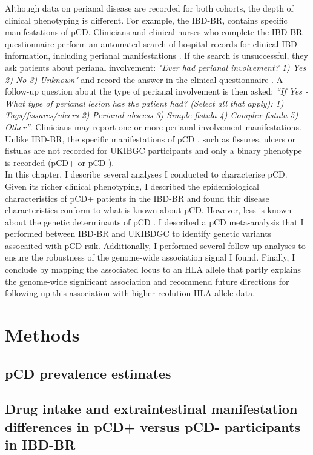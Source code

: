 Although data on perianal disease are recorded for both cohorts, the depth of clinical phenotyping is different. For example, the IBD-BR, contains specific manifestations of pCD. Clinicians and clinical nurses who complete the IBD-BR questionnaire perform an automated search of hospital records for clinical IBD information, including perianal manifestations \cite{ibdbr-protocol-v8}.  If the search is unsuccessful, they ask patients about perianal involvement: \textit{"Ever had perianal involvement? 1) Yes 2) No 3) Unknown"}  and record the answer in the clinical questionnaire \cite{ibdbr-questionnaire-v7}. A follow-up question about the type of perianal involvement is then asked: \textit{“If Yes - What type of perianal lesion has the patient had? (Select all that apply): 1) Tags/fissures/ulcers 2) Perianal abscess 3) Simple fistula 4) Complex fistula 5) Other”}. Clinicians may report one or more perianal involvement manifestations.  Unlike IBD-BR, the specific manifestations of pCD , such as fissures, ulcers or fistulas are not recorded for UKIBGC participants and only a binary phenotype is recorded (pCD+ or pCD-). \\

In this chapter, I describe several analyses I conducted to characterise pCD. Given its richer clinical phenotyping, I described the epidemiological characteristics of pCD+ patients in the IBD-BR and found thir disease characteristics conform to what is known about pCD. However, less is known about the genetic determinants of pCD \cite{Eglinton2012-ls,Latiano2009-bu,Tozer2009-mp,Akhlaghpour2023-jw,Kaur2016-bs}. I described a pCD meta-analysis that I performed between IBD-BR and UKIBDGC to identify genetic variants assocaited with pCD rsik. Additionally, I performed several follow-up analyses to ensure the robustness of the genome-wide association signal I found. Finally, I conclude by mapping the associated locus to an HLA allele that partly explains the genome-wide significant association and recommend future directions for following up this association with higher reolution HLA allele data.

\section{Methods}
\subsection{pCD prevalence estimates}
\subsection{Drug intake and extraintestinal manifestation differences in pCD+ versus pCD- participants in IBD-BR}

